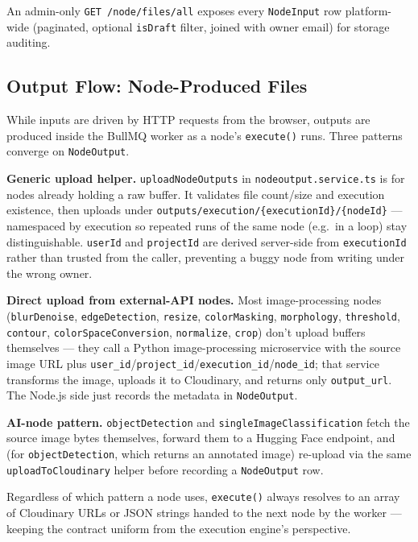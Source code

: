 An admin-only \texttt{GET /node/files/all} exposes every \texttt{NodeInput} row platform-wide (paginated, optional \texttt{isDraft} filter, joined with owner email) for storage auditing.

\subsection{Output Flow: Node-Produced Files}
\label{subsec:output-flow}

While inputs are driven by HTTP requests from the browser, outputs are produced inside the BullMQ worker as a node's \texttt{execute()} runs. Three patterns converge on \texttt{NodeOutput}.

\textbf{Generic upload helper.} \texttt{uploadNodeOutputs} in \texttt{nodeoutput.service.ts} is for nodes already holding a raw buffer. It validates file count/size and execution existence, then uploads under \texttt{outputs/execution/\{executionId\}/\{nodeId\}} — namespaced by execution so repeated runs of the same node (e.g.\ in a loop) stay distinguishable. \texttt{userId} and \texttt{projectId} are derived server-side from \texttt{executionId} rather than trusted from the caller, preventing a buggy node from writing under the wrong owner.

\textbf{Direct upload from external-API nodes.} Most image-processing nodes (\texttt{blurDenoise}, \texttt{edgeDetection}, \texttt{resize}, \texttt{colorMasking}, \texttt{morphology}, \texttt{threshold}, \texttt{contour}, \texttt{colorSpaceConversion}, \texttt{normalize}, \texttt{crop}) don't upload buffers themselves — they call a Python image-processing microservice with the source image URL plus \texttt{user\_id}/\texttt{project\_id}/\texttt{execution\_id}/\texttt{node\_id}; that service transforms the image, uploads it to Cloudinary, and returns only \texttt{output\_url}. The Node.js side just records the metadata in \texttt{NodeOutput}.

\textbf{AI-node pattern.} \texttt{objectDetection} and \texttt{singleImageClassification} fetch the source image bytes themselves, forward them to a Hugging Face endpoint, and (for \texttt{objectDetection}, which returns an annotated image) re-upload via the same \texttt{uploadToCloudinary} helper before recording a \texttt{NodeOutput} row.

Regardless of which pattern a node uses, \texttt{execute()} always resolves to an array of Cloudinary URLs or JSON strings handed to the next node by the worker — keeping the contract uniform from the execution engine's perspective.

